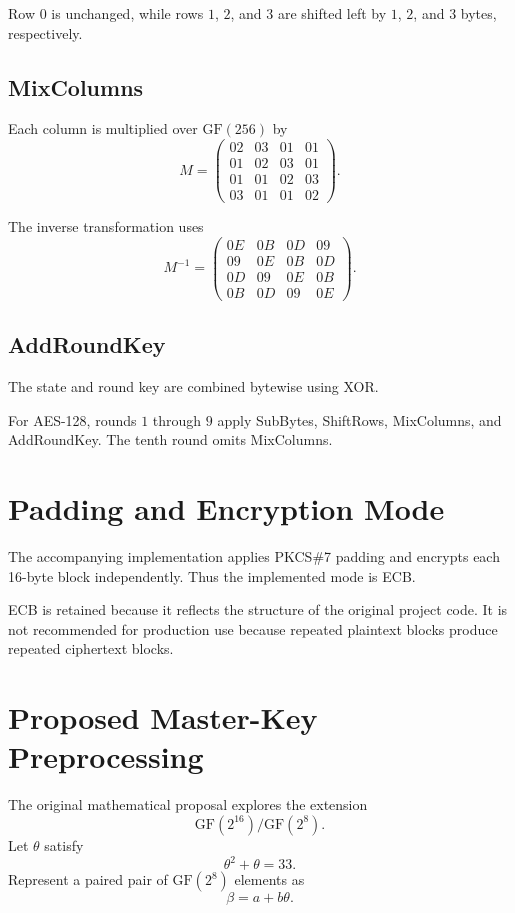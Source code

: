 \documentclass[11pt,a4paper]{article}
\begin{document}
Row $0$ is unchanged, while rows $1$, $2$, and $3$ are shifted left by
$1$, $2$, and $3$ bytes, respectively.

\subsection{MixColumns}

Each column is multiplied over $\mathrm{GF}(256)$ by
\[
M=
\begin{pmatrix}
02&03&01&01\\
01&02&03&01\\
01&01&02&03\\
03&01&01&02
\end{pmatrix}.
\]

The inverse transformation uses
\[
M^{-1}=
\begin{pmatrix}
0E&0B&0D&09\\
09&0E&0B&0D\\
0D&09&0E&0B\\
0B&0D&09&0E
\end{pmatrix}.
\]

\subsection{AddRoundKey}

The state and round key are combined bytewise using XOR.

For AES-128, rounds $1$ through $9$ apply SubBytes, ShiftRows, MixColumns,
and AddRoundKey. The tenth round omits MixColumns.

\section{Padding and Encryption Mode}

The accompanying implementation applies PKCS\#7 padding and encrypts each
16-byte block independently. Thus the implemented mode is ECB.

ECB is retained because it reflects the structure of the original project
code. It is not recommended for production use because repeated plaintext
blocks produce repeated ciphertext blocks.

\section{Proposed Master-Key Preprocessing}

The original mathematical proposal explores the extension
\[
\mathrm{GF}(2^{16})/\mathrm{GF}(2^8).
\]
Let $\theta$ satisfy
\[
\theta^2+\theta=33.
\]
Represent a paired pair of $\mathrm{GF}(2^8)$ elements as
\[
\beta=a+b\theta.
\]
\end{document}
